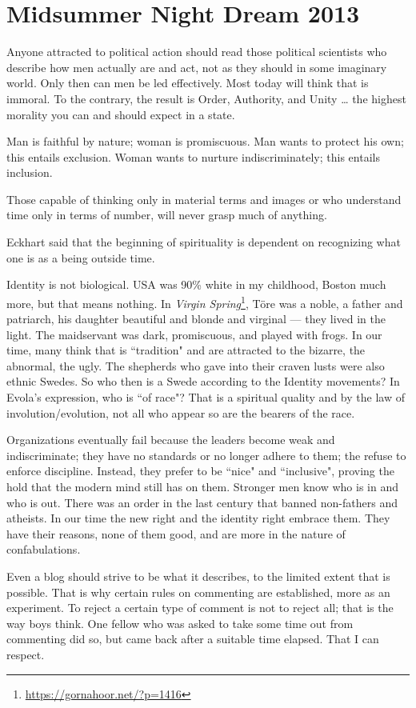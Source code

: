 \section{Midsummer Night Dream 2013}

Anyone attracted to political action should read those political scientists who describe how men actually are and act, not as they should in some imaginary world. Only then can men be led effectively. Most today will think that is immoral. To the contrary, the result is Order, Authority, and Unity … the highest morality you can and should expect in a state.

Man is faithful by nature; woman is promiscuous. Man wants to protect his own; this entails exclusion. Woman wants to nurture indiscriminately; this entails inclusion.

Those capable of thinking only in material terms and images or who understand time only in terms of number, will never grasp much of anything.

Eckhart said that the beginning of spirituality is dependent on recognizing what one is as a being outside time.

Identity is not biological. USA was 90\% white in my childhood, Boston much more, but that means nothing. In \textit{Virgin Spring}\footnote{\url{https://gornahoor.net/?p=1416}}, Töre was a noble, a father and patriarch, his daughter beautiful and blonde and virginal — they lived in the light. The maidservant was dark, promiscuous, and played with frogs. In our time, many think that is ``tradition" and are attracted to the bizarre, the abnormal, the ugly. The shepherds who gave into their craven lusts were also ethnic Swedes. So who then is a Swede according to the Identity movements? In Evola's expression, who is ``of race"? That is a spiritual quality and by the law of involution/evolution, not all who appear so are the bearers of the race.

Organizations eventually fail because the leaders become weak and indiscriminate; they have no standards or no longer adhere to them; the refuse to enforce discipline. Instead, they prefer to be ``nice" and ``inclusive", proving the hold that the modern mind still has on them. Stronger men know who is in and who is out. There was an order in the last century that banned non-fathers and atheists. In our time the new right and the identity right embrace them. They have their reasons, none of them good, and are more in the nature of confabulations.

Even a blog should strive to be what it describes, to the limited extent that is possible. That is why certain rules on commenting are established, more as an experiment. To reject a certain type of comment is not to reject all; that is the way boys think. One fellow who was asked to take some time out from commenting did so, but came back after a suitable time elapsed. That I can respect.

